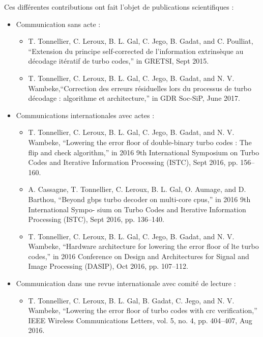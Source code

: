 Ces différentes contributions ont fait l'objet de publications scientifiques : \\
\begin{itemize}
	\item Communication sans acte :
	\begin{itemize}
		\item T. Tonnellier, C. Leroux, B. L. Gal, C. Jego, B. Gadat, and C. Poulliat, “Extension
		du principe self-corrected de l’information extrinsèque au décodage itératif de turbo
		codes,” in GRETSI, Sept 2015.
		\item T. Tonnellier, C. Leroux, B. L. Gal, C. Jego, B. Gadat, and N. V. Wambeke,“Correction 
		des erreurs résiduelles lors du processus de turbo décodage : algorithme et architecture,”
		in GDR Soc-SiP, June 2017.\\
	\end{itemize}
	\item Communications internationales avec actes :
	\begin{itemize}
		\item T. Tonnellier, C. Leroux, B. L. Gal, C. Jego, B. Gadat, and N. V. Wambeke,
		“Lowering the error floor of double-binary turbo codes : The flip and check algorithm,”
		in 2016 9th International Symposium on Turbo Codes and Iterative Information
		Processing (ISTC), Sept 2016, pp. 156–160.
		\item A. Cassagne, T. Tonnellier, C. Leroux, B. L. Gal, O. Aumage, and D. Barthou,
		“Beyond gbps turbo decoder on multi-core cpus,” in 2016 9th International Sympo-
		sium on Turbo Codes and Iterative Information Processing (ISTC), Sept 2016, pp. 136–140.
		\item T. Tonnellier, C. Leroux, B. L. Gal, C. Jego, B. Gadat, and N. V. Wambeke,
		“Hardware architecture for lowering the error floor of lte turbo codes,” in 2016
		Conference on Design and Architectures for Signal and Image Processing (DASIP),
		Oct 2016, pp. 107–112.\\
	\end{itemize}
	\item Communication dans une revue internationale avec comité de lecture :
	\begin{itemize}
		\item T. Tonnellier, C. Leroux, B. L. Gal, B. Gadat, C. Jego, and N. V. Wambeke,
		“Lowering the error floor of turbo codes with crc verification,” IEEE Wireless
		Communications Letters, vol. 5, no. 4, pp. 404–407, Aug 2016.
	\end{itemize}
\end{itemize}


